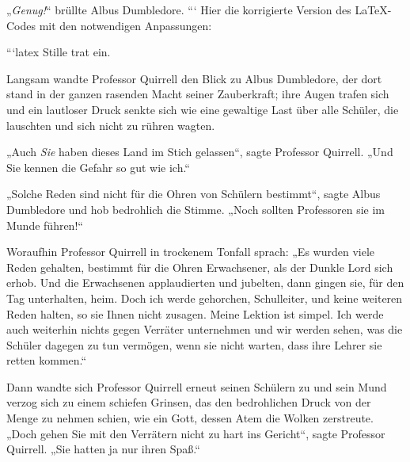 „\emph{Genug!}“ brüllte Albus Dumbledore.
```
Hier die korrigierte Version des LaTeX-Codes mit den notwendigen Anpassungen:

```latex
Stille trat ein.

Langsam wandte Professor Quirrell den Blick zu Albus Dumbledore, der dort stand in der ganzen rasenden Macht seiner Zauberkraft; ihre Augen trafen sich und ein lautloser Druck senkte sich wie eine gewaltige Last über alle Schüler, die lauschten und sich nicht zu rühren wagten.

„Auch \emph{Sie} haben dieses Land im Stich gelassen“, sagte Professor Quirrell.
„Und Sie kennen die Gefahr so gut wie ich.“

„Solche Reden sind nicht für die Ohren von Schülern bestimmt“, sagte Albus Dumbledore und hob bedrohlich die Stimme.
„Noch sollten Professoren sie im Munde führen!“

Woraufhin Professor Quirrell in trockenem Tonfall sprach:
„Es wurden viele Reden gehalten, bestimmt für die Ohren Erwachsener, als der Dunkle Lord sich erhob. Und die Erwachsenen applaudierten und jubelten, dann gingen sie, für den Tag unterhalten, heim. Doch ich werde gehorchen, Schulleiter, und keine weiteren Reden halten, so sie Ihnen nicht zusagen. Meine Lektion ist simpel. Ich werde auch weiterhin nichts gegen Verräter unternehmen und wir werden sehen, was die Schüler dagegen zu tun vermögen, wenn sie nicht warten, dass ihre Lehrer sie retten kommen.“

Dann wandte sich Professor Quirrell erneut seinen Schülern zu und sein Mund verzog sich zu einem schiefen Grinsen, das den bedrohlichen Druck von der Menge zu nehmen schien, wie ein Gott, dessen Atem die Wolken zerstreute.
„Doch gehen Sie mit den Verrätern nicht zu hart ins Gericht“, sagte Professor Quirrell.
„Sie hatten ja nur ihren Spaß.“


